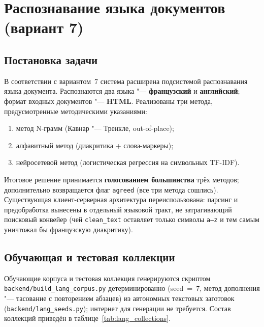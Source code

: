 \section{Распознавание языка документов (вариант 7)}
\label{sec:langdetect}

\subsection{Постановка задачи}

В соответствии с вариантом~7 система расширена подсистемой распознавания
языка документа. Распознаются два языка "--- \textbf{французский} и
\textbf{английский}; формат входных документов "--- \textbf{HTML}.
Реализованы три метода, предусмотренные методическими указаниями:

\begin{enumerate}
	\item метод N-грамм (Кавнар "--- Тренкле, out-of-place);
	\item алфавитный метод (диакритика + слова-маркеры);
	\item нейросетевой метод (логистическая регрессия на символьных TF-IDF).
\end{enumerate}

Итоговое решение принимается \textbf{голосованием большинства} трёх методов;
дополнительно возвращается флаг \texttt{agreed} (все три метода сошлись).
Существующая клиент-серверная архитектура переиспользована: парсинг и
предобработка вынесены в отдельный языковой тракт, не затрагивающий
поисковый конвейер (чей \texttt{clean\_text} оставляет только символы
\texttt{a--z} и тем самым уничтожал бы французскую диакритику).

\subsection{Обучающая и тестовая коллекции}

Обучающие корпуса и тестовая коллекция генерируются скриптом
\texttt{backend/build\_lang\_corpus.py} детерминированно (seed~=~7, метод
дополнения "--- тасование с повторением абзацев) из автономных текстовых
заготовок (\texttt{backend/lang\_seeds.py}); интернет для генерации не
требуется. Состав коллекций приведён в таблице~\ref{tab:lang_collections}.

